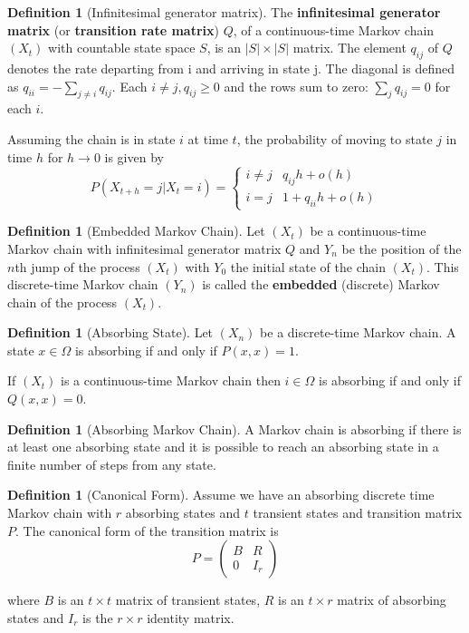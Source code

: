 \documentclass{article}
\theoremstyle{plain}
\theoremstyle{definition}
\newtheorem{defn}[theorem]{Definition}
\theoremstyle{remark}
\numberwithin{equation}{section}
\begin{document}
\begin{defn}[Infinitesimal generator matrix]
The \textbf{infinitesimal generator matrix} (or \textbf{transition rate matrix}) $Q$, of a continuous-time Markov chain $(X_t)$ with countable state space $S$, is an $|S| \times |S|$ matrix.
The element $q_{ij}$ of $Q$ denotes the rate departing from i and arriving in state j.
The diagonal is defined as $q_{ii} = - \sum_{j \not = i} q_{ij}$.
Each $i \not = j, q_{ij} \geq 0$ and the rows sum to zero: $\sum_{j} q_{ij} = 0$ for each $i$.

Assuming the chain is in state $i$ at time $t$, the probability of moving to state $j$ in time $h$ for $h \to 0$ is given by
$$
P(X_{t + h} = j | X_{t} = i) = \begin{cases}
    i \not = j & q_{ij} h + o(h)\\
    i = j & 1 + q_{ii} h + o(h)
\end{cases}
$$
\end{defn}

\begin{defn}[Embedded Markov Chain]
Let $(X_t)$ be a continuous-time Markov chain with infinitesimal generator matrix $Q$ and $Y_n$ be the position of the $n$th jump of the process $(X_t)$ with $Y_0$ the initial state of the chain $(X_t)$.
This discrete-time Markov chain $(Y_n)$ is called the \textbf{embedded} (discrete) Markov chain of the process $(X_t)$.
\end{defn}

\begin{defn}[Absorbing State] \cite{grinstead2003}
Let $(X_n)$ be a discrete-time Markov chain.
A state $x \in \Omega$ is absorbing if and only if $P(x,x) = 1$.

If $(X_t)$ is a continuous-time Markov chain then $i \in \Omega$ is absorbing if and only if $Q(x,x) = 0$.
\end{defn}

\begin{defn}[Absorbing Markov Chain] \cite{grinstead2003}
A Markov chain is absorbing if there is at least one absorbing state and it is possible to reach an absorbing state in a finite number of steps from any state.
\end{defn}

\begin{defn}[Canonical Form] \cite{grinstead2003}
Assume we have an absorbing discrete time Markov chain with $r$ absorbing states and $t$ transient states and  transition matrix $P$.
The canonical form of the transition matrix is
\begin{equation}
    P = \begin{pmatrix}
        B & R\\
        0 & I_{r}
    \end{pmatrix}
\end{equation}

where $B$ is an $t \times t$ matrix of transient states, $R$ is an $t \times r$ matrix of absorbing states and $I_{r}$ is the $r \times r$ identity matrix.
\end{defn}
\end{document}
